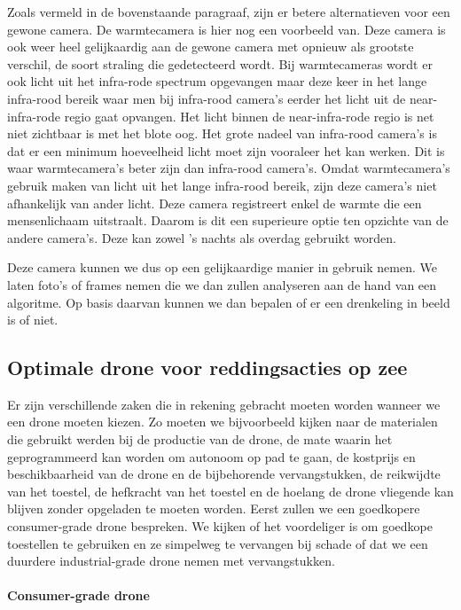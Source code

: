 \subitem
Zoals vermeld in de bovenstaande paragraaf, zijn er betere alternatieven voor een gewone camera. De warmtecamera is hier nog een voorbeeld van. Deze camera is ook weer heel gelijkaardig aan de gewone camera met opnieuw als grootste verschil, de soort straling die gedetecteerd wordt. Bij warmtecameras wordt er ook licht uit het infra-rode spectrum opgevangen maar deze keer in het lange infra-rood bereik waar men bij infra-rood camera's eerder het licht uit de near-infra-rode regio gaat opvangen. Het licht binnen de near-infra-rode regio is net niet zichtbaar is met het blote oog. Het grote nadeel van infra-rood camera's is dat er een minimum hoeveelheid licht moet zijn vooraleer het kan werken. Dit is waar warmtecamera's beter zijn dan infra-rood camera's. Omdat warmtecamera's gebruik maken van licht uit het lange infra-rood bereik, zijn deze camera's niet afhankelijk van ander licht. Deze camera registreert enkel de warmte die een mensenlichaam uitstraalt. Daarom is dit een superieure optie ten opzichte van de andere camera's. Deze kan zowel 's nachts als overdag gebruikt worden. 

\subitem
Deze camera kunnen we dus op een gelijkaardige manier in gebruik nemen. We laten foto's of frames nemen die we dan zullen analyseren aan de hand van een algoritme. Op basis daarvan kunnen we dan bepalen of er een drenkeling in beeld is of niet. 



\subsection{Optimale drone voor reddingsacties op zee}

\subitem
Er zijn verschillende zaken die in rekening gebracht moeten worden wanneer we een drone moeten kiezen. Zo moeten we bijvoorbeeld kijken naar de materialen die gebruikt werden bij de productie van de drone, de mate waarin het geprogrammeerd kan worden om autonoom op pad te gaan, de kostprijs en beschikbaarheid van de drone en de bijbehorende vervangstukken, de reikwijdte van het toestel, de hefkracht van het toestel en de hoelang de drone vliegende kan blijven zonder opgeladen te moeten worden. Eerst zullen we een goedkopere consumer-grade drone bespreken. We kijken of het voordeliger is om goedkope toestellen te gebruiken en ze simpelweg te vervangen bij schade of dat we een duurdere industrial-grade drone nemen met vervangstukken.

\paragraph{Consumer-grade drone}

